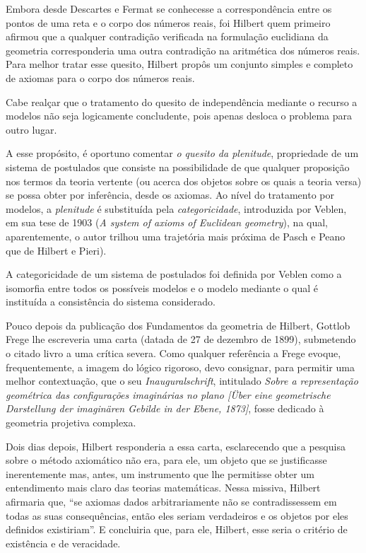 \documentclass{hipatia}
\begin{document}
Embora desde Descartes e Fermat se conhecesse a correspondência entre os pontos de uma reta e o corpo dos números reais, foi Hilbert quem primeiro afirmou que a qualquer contradição verificada na formulação euclidiana da geometria corresponderia uma outra contradição na aritmética dos números reais. Para melhor tratar esse quesito, Hilbert propôs um conjunto simples e completo de axiomas para o corpo dos números reais.

Cabe realçar que o tratamento do quesito de independência mediante o recurso a modelos não seja logicamente concludente, pois apenas desloca o problema para outro lugar. 

A esse propósito, é oportuno comentar \emph{o quesito da plenitude}, propriedade de um sistema de postulados que consiste na possibilidade de que qualquer proposição nos termos da teoria vertente (ou acerca dos objetos sobre os quais a teoria versa) se possa obter por inferência, desde os axiomas. Ao nível do tratamento por modelos, a \emph{plenitude} é substituída pela \emph{categoricidade},  introduzida por Veblen, em sua tese de 1903  (\emph{A system of axioms of Euclidean geometry}), na qual, aparentemente, o autor trilhou uma trajetória mais próxima de Pasch e Peano que de Hilbert e Pieri). 

A categoricidade de um sistema de postulados foi definida por Veblen como a isomorfia entre todos os possíveis modelos e o modelo mediante o qual é instituída a consistência do sistema considerado. \cite[p. 638]{weyl1944}

Pouco depois da publicação dos Fundamentos da geometria de Hilbert, Gottlob Frege lhe escreveria uma carta (datada de 27 de dezembro de 1899), submetendo o citado livro a uma crítica severa. Como qualquer referência a Frege evoque, frequentemente, a imagem do lógico rigoroso, devo consignar, para permitir uma melhor contextuação, que o seu \emph{Inauguralschrift}, intitulado \emph{Sobre a representação geométrica das configurações imaginárias no plano  [Über eine geometrische Darstellung der imaginären Gebilde in der Ebene, 1873]}, fosse dedicado à geometria projetiva complexa. \cite[p. 383]{belna2002}

Dois dias depois, Hilbert responderia a essa carta, esclarecendo que a pesquisa sobre o método axiomático não era, para ele, um objeto que se justificasse inerentemente mas, antes, um instrumento que lhe permitisse obter um entendimento mais claro das teorias matemáticas. Nessa missiva, Hilbert afirmaria que, ``se axiomas dados arbitrariamente não se contradissessem em todas as suas consequências, então eles seriam verdadeiros e os objetos por eles definidos existiriam''. E concluiria que, para ele, Hilbert, esse seria o critério de existência e de veracidade.  \cite[p. 117]{corry1997a}
\end{document}
